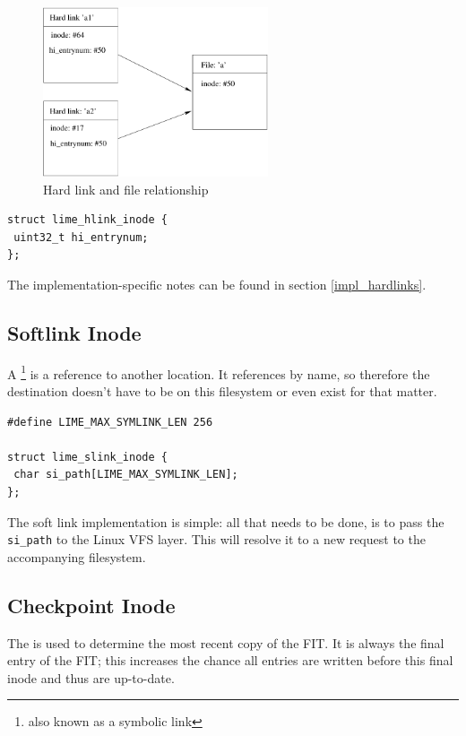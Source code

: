 \begin{figure}[h]
\includegraphics[height=5cm]{hard-link}
\caption{Hard link and file relationship}
\end{figure}

\begin{verbatim}
struct lime_hlink_inode {
 uint32_t hi_entrynum;
};
\end{verbatim}

The implementation-specific notes can be found in section \ref{impl_hardlinks}.

\subsection{Softlink Inode}

A \footnote{also known as a symbolic link} is a reference to another location. It references by name, so therefore the destination doesn't have to be on this filesystem or even exist for that matter.

\begin{verbatim}
#define LIME_MAX_SYMLINK_LEN 256

struct lime_slink_inode {
 char si_path[LIME_MAX_SYMLINK_LEN];
};
\end{verbatim}

The soft link implementation is simple: all that needs to be done, is to pass the \texttt{si\_path} to the Linux VFS layer. This will resolve it to a new request to the accompanying filesystem.

\subsection{Checkpoint Inode}

The  is used to determine the most recent copy of the FIT. It is always the final entry of the FIT; this increases the chance all entries are written before this final inode and thus are up-to-date.

